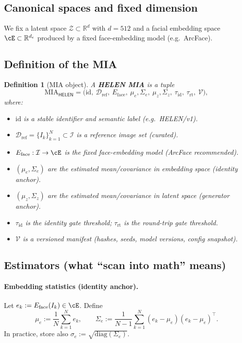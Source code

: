 \documentclass[12pt]{amsart}
\numberwithin{equation}{section}
\newtheorem{definition}{Definition}[section]
\newcommand{\cZ}{\mathcal{Z}}
\newcommand{\cI}{\mathcal{I}}
\begin{document}
\subsection{Canonical spaces and fixed dimension}
We fix a latent space $\cZ\subset\mathbb{R}^{d}$ with $d=512$ and a facial embedding
space $\cE\subset\mathbb{R}^{d_e}$ produced by a fixed face-embedding model
(e.g.\ ArcFace).

\subsection{Definition of the MIA}
\begin{definition}[MIA object]
A \textbf{HELEN MIA} is a tuple
\[
\mathrm{MIA}_{\textsf{HELEN}}
=
\Big(
\mathrm{id},\ \mathcal{D}_{\text{ref}},\ E_{\text{face}},\ \mu_e,\Sigma_e,\
\mu_z,\Sigma_z,\ \tau_{\mathrm{id}},\ \tau_{\mathrm{rt}},\ \mathcal{V}
\Big),
\]
where:
\begin{itemize}
  \item $\mathrm{id}$ is a stable identifier and semantic label (e.g.\ \textsf{HELEN/v1}).
  \item $\mathcal{D}_{\text{ref}}=\{I_k\}_{k=1}^N\subset\cI$ is a reference image set (curated).
  \item $E_{\text{face}}:\cI\to\cE$ is the fixed face-embedding model (ArcFace recommended).
  \item $(\mu_e,\Sigma_e)$ are the estimated mean/covariance in embedding space (identity anchor).
  \item $(\mu_z,\Sigma_z)$ are the estimated mean/covariance in latent space (generator anchor).
  \item $\tau_{\mathrm{id}}$ is the identity gate threshold; $\tau_{\mathrm{rt}}$ is the round-trip gate threshold.
  \item $\mathcal{V}$ is a versioned manifest (hashes, seeds, model versions, config snapshot).
\end{itemize}
\end{definition}

\subsection{Estimators (what ``scan into math'' means)}
\paragraph{Embedding statistics (identity anchor).}
Let $e_k := E_{\text{face}}(I_k)\in\cE$. Define
\[
\mu_e := \frac{1}{N}\sum_{k=1}^N e_k,
\qquad
\Sigma_e := \frac{1}{N-1}\sum_{k=1}^N (e_k-\mu_e)(e_k-\mu_e)^\top.
\]
In practice, store also $\sigma_e := \sqrt{\mathrm{diag}(\Sigma_e)}$.
\end{document}
